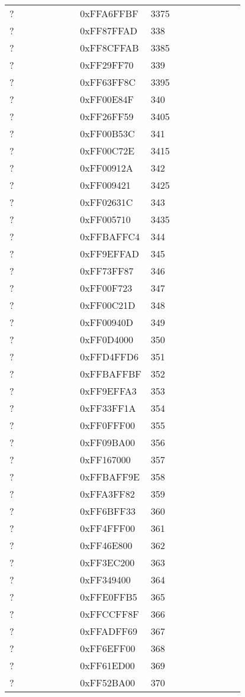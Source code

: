 \begin{longtable}{p{0.3\linewidth} p{0.3\linewidth} p{0.4\linewidth}}
? &  0xFFA6FFBF &  3375\\
? &  0xFF87FFAD &  338\\
? &  0xFF8CFFAB &  3385\\
? &  0xFF29FF70 &  339\\
? &  0xFF63FF8C &  3395\\
? &  0xFF00E84F &  340\\
? &  0xFF26FF59 &  3405\\
? &  0xFF00B53C &  341\\
? &  0xFF00C72E &  3415\\
? &  0xFF00912A &  342\\
? &  0xFF009421 &  3425\\
? &  0xFF02631C &  343\\
? &  0xFF005710 &  3435\\
? &  0xFFBAFFC4 &  344\\
? &  0xFF9EFFAD &  345\\
? &  0xFF73FF87 &  346\\
? &  0xFF00F723 &  347\\
? &  0xFF00C21D &  348\\
? &  0xFF00940D &  349\\
? &  0xFF0D4000 &  350\\
? &  0xFFD4FFD6 &  351\\
? &  0xFFBAFFBF &  352\\
? &  0xFF9EFFA3 &  353\\
? &  0xFF33FF1A &  354\\
? &  0xFF0FFF00 &  355\\
? &  0xFF09BA00 &  356\\
? &  0xFF167000 &  357\\
? &  0xFFBAFF9E &  358\\
? &  0xFFA3FF82 &  359\\
? &  0xFF6BFF33 &  360\\
? &  0xFF4FFF00 &  361\\
? &  0xFF46E800 &  362\\
? &  0xFF3EC200 &  363\\
? &  0xFF349400 &  364\\
? &  0xFFE0FFB5 &  365\\
? &  0xFFCCFF8F &  366\\
? &  0xFFADFF69 &  367\\
? &  0xFF6EFF00 &  368\\
? &  0xFF61ED00 &  369\\
? &  0xFF52BA00 &  370\\

\end{longtable}
